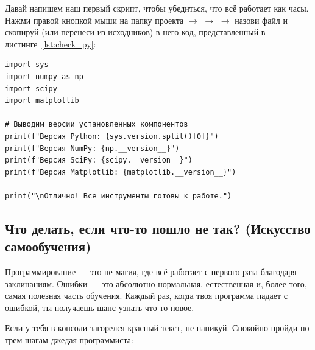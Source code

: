 
Давай напишем наш первый скрипт, чтобы убедиться, что всё работает как часы. Нажми правой кнопкой мыши на папку проекта $\rightarrow$  $\rightarrow$  $\rightarrow$ назови файл  и скопируй (или перенеси из исходников) в него код, представленный в листинге~\ref{lst:check_py}:

\begin{listing}[H]
	\caption{Скрипт для проверки библиотек (check.py)}\label{lst:check_py}
	\begin{verbatim}
import sys
import numpy as np
import scipy
import matplotlib

# Выводим версии установленных компонентов
print(f"Версия Python: {sys.version.split()[0]}")
print(f"Версия NumPy: {np.__version__}")
print(f"Версия SciPy: {scipy.__version__}")
print(f"Версия Matplotlib: {matplotlib.__version__}")

print("\nОтлично! Все инструменты готовы к работе.")
	\end{verbatim}
\end{listing}




\subsection{Что делать, если что-то пошло не так? (Искусство самообучения)}

Программирование — это не магия, где всё работает с первого раза благодаря заклинаниям. Ошибки — это абсолютно нормальная, естественная и, более того, самая полезная часть обучения. Каждый раз, когда твоя программа падает с ошибкой, ты получаешь шанс узнать что-то новое.

Если у тебя в консоли загорелся красный текст, не паникуй. Спокойно пройди по трем шагам джедая-программиста:

